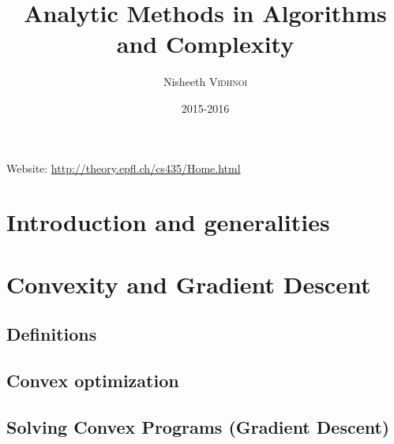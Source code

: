 

\title{Analytic Methods in Algorithms and Complexity}
\author{Nisheeth \textsc{Vidhnoi}}
\date{2015-2016}


\maketitle
\tableofcontents

\newpage

Website: \url{http://theory.epfl.ch/cs435/Home.html}

\chapter*{Introduction and generalities}
    
    
\chapter{Convexity and Gradient Descent}
    \section{Definitions}
        

    \section{Convex optimization}
        
        
    \section{Solving Convex Programs (Gradient Descent)}
        



\nocite{*}







